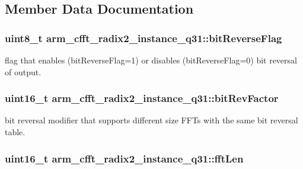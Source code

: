 \subsection{Member Data Documentation}
\hypertarget{structarm__cfft__radix2__instance__q31_a6239b8d268285334e88c008c07d68616}{
\subsubsection[{bit\-Reverse\-Flag}]{\setlength{\rightskip}{0pt plus 5cm}uint8\-\_\-t arm\-\_\-cfft\-\_\-radix2\-\_\-instance\-\_\-q31\-::bit\-Reverse\-Flag}}\label{structarm__cfft__radix2__instance__q31_a6239b8d268285334e88c008c07d68616}
flag that enables (bit\-Reverse\-Flag=1) or disables (bit\-Reverse\-Flag=0) bit reversal of output. \hypertarget{structarm__cfft__radix2__instance__q31_a9d17a87263953fe3559a007512c9f3a4}{
\subsubsection[{bit\-Rev\-Factor}]{\setlength{\rightskip}{0pt plus 5cm}uint16\-\_\-t arm\-\_\-cfft\-\_\-radix2\-\_\-instance\-\_\-q31\-::bit\-Rev\-Factor}}\label{structarm__cfft__radix2__instance__q31_a9d17a87263953fe3559a007512c9f3a4}
bit reversal modifier that supports different size F\-F\-Ts with the same bit reversal table. \hypertarget{structarm__cfft__radix2__instance__q31_a960199f1373a192366878ef279eab00f}{
\subsubsection[{fft\-Len}]{\setlength{\rightskip}{0pt plus 5cm}uint16\-\_\-t arm\-\_\-cfft\-\_\-radix2\-\_\-instance\-\_\-q31\-::fft\-Len}}\label{structarm__cfft__radix2__instance__q31_a960199f1373a192366878ef279eab00f}
